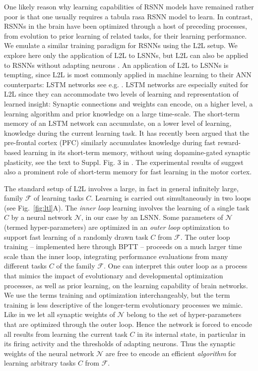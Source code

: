 \documentclass{article} \pdfoutput=1
\begin{document}
One likely reason why learning capabilities of RSNN models have remained rather poor is that one usually requires a tabula rasa RSNN model to learn.
In contrast, RSNNs in the brain have been optimized through a host of preceding processes, from evolution to prior learning of related tasks, for their learning performance. 
We emulate a similar training paradigm for RSNNs using the L2L setup.
We explore here only the application of L2L to LSNNs, but L2L can also be applied to RSNNs without adapting neurons \cite{subramoney_etal_2018}.
An application of L2L to LSNNs is tempting, since L2L is most commonly applied in machine learning to their ANN counterparts: LSTM networks
see e.g. \cite{wang2016learning,duan2016rl}.
LSTM networks are especially suited for L2L since they can accommodate two levels of learning and representation of learned insight: Synaptic connections and weights can encode, on a higher level, a learning algorithm and prior knowledge on a large time-scale.
The short-term memory of an LSTM network can accumulate, on a lower level of learning, knowledge during the current learning task.
It has recently been argued \cite{WangETAL:18} that the pre-frontal cortex (PFC) similarly accumulates knowledge during fast reward-based learning in its short-term memory, without using dopamine-gated synaptic plasticity, see the text to Suppl. Fig. 3 in \cite{WangETAL:18}. The experimental results of \cite{perich2018neural} suggest also a prominent role of short-term memory for fast learning in the motor cortex.

The standard setup of L2L involves a large, in fact in general infinitely large, family $\mathcal{F}$ of learning tasks $C$.
Learning is carried out simultaneously in two loops (see Fig.~\ref{fig:ltl}A).
The {\em inner loop} learning involves the learning of a single task $C$ by a neural network $\mathcal{N}$, in our case by an LSNN. Some parameters of $\mathcal{N}$ (termed hyper-parameters) are optimized in an {\em outer loop} optimization to support fast learning of a randomly drawn task $C$ from $\mathcal{F}$.
The outer loop training -- implemented here through BPTT -- proceeds on a much larger time scale than the inner loop, integrating performance evaluations from many different tasks $C$ of the family $\mathcal{F}$.  
One can interpret this outer loop as a process that mimics the impact of evolutionary and developmental optimization processes, as well as prior learning, on the learning capability of brain networks. 
We use the terms training and optimization interchangeably, but the term training is less descriptive of the longer-term evolutionary processes we mimic.
Like in \cite{hochreiter2001learning,wang2016learning,duan2016rl} we let all synaptic weights of $\mathcal{N}$ belong to the set of hyper-parameters that are optimized through the outer loop.
Hence the network is forced to encode all results from learning the current task $C$ in its internal state, in particular in its firing activity and the thresholds of adapting neurons.
Thus the synaptic weights of the neural network $\mathcal{N}$ are free to encode an efficient \textit{algorithm} for learning arbitrary tasks $C$ from $\mathcal{F}$. 
\end{document}

